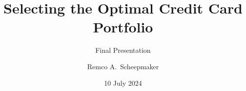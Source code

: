 \documentclass[notes,compress,sanserif,professionalfont]{beamer}
\begin{document}
\title{Selecting the Optimal Credit Card Portfolio}
\subtitle{Final Presentation}
\author{Remco A.~Scheepmaker}
\date{10 July 2024}

\begin{frame}
  \titlepage
\end{frame}



%
\end{document}
